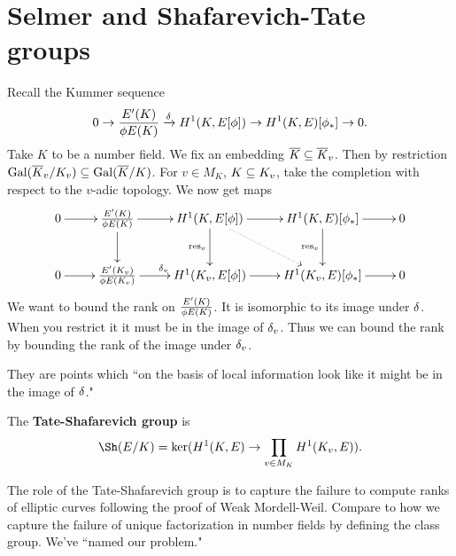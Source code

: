 \section{Selmer and Shafarevich-Tate groups}
Recall the Kummer sequence
\[
0\to \frac{E'(K)}{\phi E(K)}\xrightarrow{\delta}H^1(K,E[\phi])\to H^1(K,E)[\phi_*]\to 0.
\]
Take $K$ to be a number field. 
We fix an embedding $\overline{K}\subseteq \overline{K}_v$. Then by restriction $\operatorname{Gal}(\overline{K}_v/K_v)\subseteq \operatorname{Gal}(\overline{K}/K)$. 
For $v\in M_K$, $K\subseteq K_v$, take the completion with respect to the $v$-adic topology. We now get maps
\[
\xymatrix{
0\ar[r] &\fc{E'(K)}{\phi E(K)}\ar[r]\ar[d]&
H^1(K,E[\phi])\ar[r]\ar[d]_{\text{res}_v}\ar@{.>}[rd]& H^1(K,E)[\phi_*]\ar[r]\ar[d]_{\text{res}_v}& 0\\
0\ar[r] &\fc{E'(K_v)}{\phi E(K_v)}
\ar[r]^{\de_v} & H^1(K_v,E[\phi]) \ar[r] & H^1(K_v,E)[\phi_*]\ar[r] &0
}
\]
We want to bound the rank on $\frac{E'(K)}{\phi E(K)}$. It is isomorphic to its image under $\delta$. When you restrict it it must be in the image of $\delta_v$. Thus we can bound the rank by bounding the rank of the image under $\delta_v$.
They are points which ``on the basis of local information look like it might be in the image of $\delta$."
\begin{df}
The \textbf{Tate-Shafarevich group} is
\[
\Sh(E/K)=\ker(H^1(K,E)\to \prod_{v\in M_K} H^1(K_v,E)).
\]
\end{df}
The role of the Tate-Shafarevich group is to capture the failure to compute ranks of elliptic curves following the proof of Weak Mordell-Weil. Compare to how we capture the failure of unique factorization in number fields by defining the class group. We've ``named our problem."
